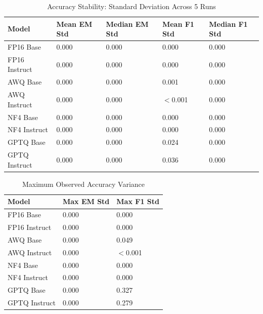 \documentclass[11pt,a4paper]{article}
\begin{document}
\begin{table}[H]
\centering
\caption{Accuracy Stability: Standard Deviation Across 5 Runs}
\begin{tabularx}{\textwidth}{@{}X C{2.2cm} C{2.2cm} C{2.2cm} C{2.2cm}@{}}
\toprule
\textbf{Model} & \textbf{Mean EM Std} & \textbf{Median EM Std} & \textbf{Mean F1 Std} & \textbf{Median F1 Std} \\
\midrule
FP16 Base & 0.000 & 0.000 & 0.000 & 0.000 \\
FP16 Instruct & 0.000 & 0.000 & 0.000 & 0.000 \\
AWQ Base & 0.000 & 0.000 & 0.001 & 0.000 \\
AWQ Instruct & 0.000 & 0.000 & $<$0.001 & 0.000 \\
NF4 Base & 0.000 & 0.000 & 0.000 & 0.000 \\
NF4 Instruct & 0.000 & 0.000 & 0.000 & 0.000 \\
GPTQ Base & 0.000 & 0.000 & 0.024 & 0.000 \\
GPTQ Instruct & 0.000 & 0.000 & 0.036 & 0.000 \\
\bottomrule
\end{tabularx}
\end{table}

\begin{table}[H]
\centering
\caption{Maximum Observed Accuracy Variance}
\begin{tabularx}{\textwidth}{@{}l C{3.5cm} C{3.5cm}@{}}
\toprule
\textbf{Model} & \textbf{Max EM Std} & \textbf{Max F1 Std} \\
\midrule
FP16 Base & 0.000 & 0.000 \\
FP16 Instruct & 0.000 & 0.000 \\
AWQ Base & 0.000 & 0.049 \\
AWQ Instruct & 0.000 & $<$0.001 \\
NF4 Base & 0.000 & 0.000 \\
NF4 Instruct & 0.000 & 0.000 \\
GPTQ Base & 0.000 & 0.327 \\
GPTQ Instruct & 0.000 & 0.279 \\
\bottomrule
\end{tabularx}
\end{table}
\end{document}

